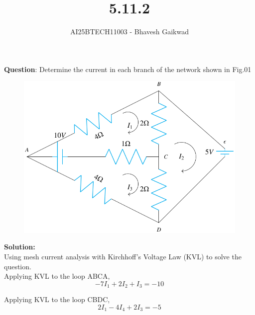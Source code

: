 \documentclass[journal]{IEEEtran}
\begin{document}

\vspace{3cm}

\title{5.11.2}
\author{AI25BTECH11003 - Bhavesh Gaikwad}
{\let\newpage\relax\maketitle}

\renewcommand{\thefigure}{\theenumi}
\renewcommand{\thetable}{\theenumi}
\setlength{\intextsep}{10pt} 


\renewcommand{\thetable}{\theenumi}


\textbf{Question}: Determine the current in each branch of the network shown in Fig.01
\begin{figure}[htbp]
    \centering
    \includegraphics[width=\columnwidth]{figs/figQ.png}
    \caption{}
    \label{fig:figs/fig1.png}
\end{figure}

\newpage

\textbf{Solution:}\\

Using mesh current analysis with Kirchhoff's Voltage Law (KVL) to solve the question.\\


Applying KVL to the loop ABCA,
\begin{equation}
-7I_1 + 2I_2 + I_3 = -10
\end{equation}


Applying KVL to the loop CBDC,
\begin{equation}
2I_1 - 4I_4 + 2I_3 = -5
\end{equation}
\end{document}
